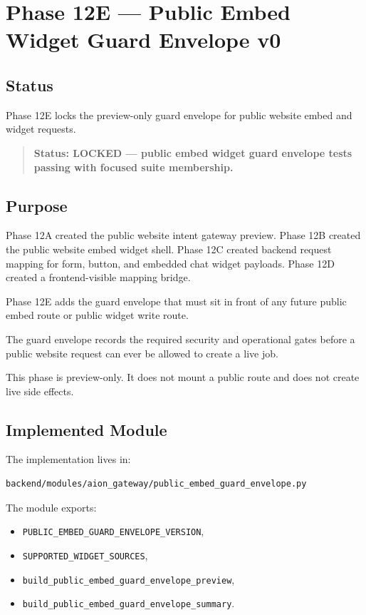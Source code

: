 \section{Phase 12E --- Public Embed Widget Guard Envelope v0}
\label{sec:aion-public-embed-guard-envelope-v0}

\subsection{Status}

Phase 12E locks the preview-only guard envelope for public website embed and widget requests.

\begin{quote}
\textbf{Status: LOCKED --- public embed widget guard envelope tests passing with focused suite membership.}
\end{quote}

\subsection{Purpose}

Phase 12A created the public website intent gateway preview.
Phase 12B created the public website embed widget shell.
Phase 12C created backend request mapping for form, button, and embedded chat widget payloads.
Phase 12D created a frontend-visible mapping bridge.

Phase 12E adds the guard envelope that must sit in front of any future public embed route or public widget write route.

The guard envelope records the required security and operational gates before a public website request can ever be allowed to create a live job.

This phase is preview-only. It does not mount a public route and does not create live side effects.

\subsection{Implemented Module}

The implementation lives in:

\begin{verbatim}
backend/modules/aion_gateway/public_embed_guard_envelope.py
\end{verbatim}

The module exports:

\begin{itemize}
  \item \texttt{PUBLIC\_EMBED\_GUARD\_ENVELOPE\_VERSION},
  \item \texttt{SUPPORTED\_WIDGET\_SOURCES},
  \item \texttt{build\_public\_embed\_guard\_envelope\_preview},
  \item \texttt{build\_public\_embed\_guard\_envelope\_summary}.
\end{itemize}

